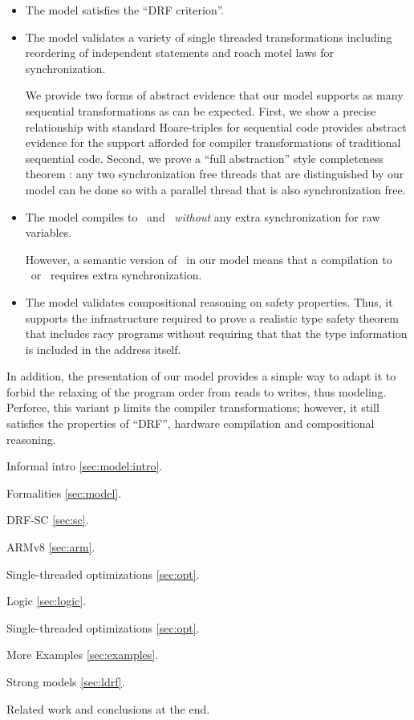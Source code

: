 \begin{itemize}
\item The model satisfies the ``DRF criterion''.  

\item The model validates a variety of single threaded transformations including reordering of independent statements and roach motel laws for synchronization.  

We provide two forms of abstract evidence that our model supports as many sequential transformations as can be expected.  First, we show a precise relationship with standard Hoare-triples for sequential code provides abstract evidence for the support afforded for compiler  transformations of traditional sequential code.  Second, we prove a ``full abstraction'' style completeness  theorem : any two synchronization free threads that are distinguished by our model can be done so with a parallel thread that is also synchronization free. 

\item The model compiles to \armeight\ and \tso\ {\em without} any extra synchronization for raw variables.  

However, a semantic version of \mca\ in our model means that a compilation to \armseven\ or \ppc\ requires extra synchronization.  

\item The model validates compositional reasoning on safety properties.  Thus, it supports the infrastructure required to prove a realistic type safety theorem that includes racy programs without requiring that that the type information is included in the address itself.
\end{itemize}
In addition, the presentation of our model provides a simple way to adapt it to forbid the relaxing of the program order from reads to writes, thus modeling\cite{Dolan:2018:BDR:3192366.3192421,BoehmOOTA}.  Perforce, this variant p limits the compiler transformations; however, it still satisfies the properties of ``DRF'', hardware compilation and compositional reasoning. 


    

Informal intro \textsection\ref{sec:model:intro}.

Formalities \textsection\ref{sec:model}.

DRF-SC \textsection\ref{sec:sc}.

ARMv8 \textsection\ref{sec:arm}.

Single-threaded optimizations \textsection\ref{sec:opt}.

Logic \textsection\ref{sec:logic}.

Single-threaded optimizations \textsection\ref{sec:opt}.

More Examples \textsection\ref{sec:examples}.

Strong models \textsection\ref{sec:ldrf}.

Related work and conclusions at the end.


